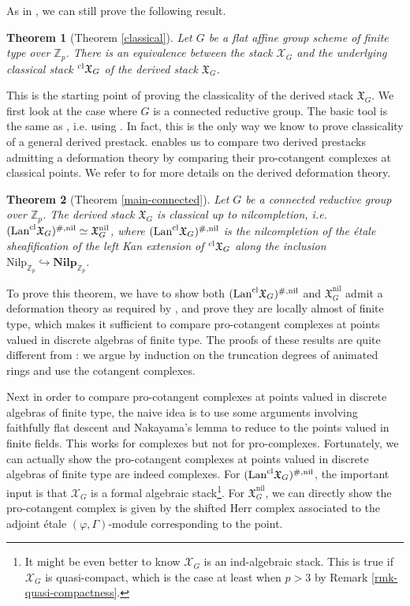 \documentclass[10pt]{article}
\newtheorem{thm}{Theorem}[section]
\numberwithin{equation}{section}
\newcommand{\frakX}{{\mathfrak X}}
\newcommand{\bZ}{{\mathbb Z}}
\newcommand{\calX}{{\mathcal X}}
\newcommand{\Lan}{{\mathrm{Lan}}}
\newcommand{\nil}{\mathrm{nil}}
\newcommand{\cl}{{\mathrm{\rm cl}}}             %
\newcommand{\Nilp}{\mathrm{Nilp}}
\begin{document}
As in \cite{Min23}, we can still prove the following result.
\begin{thm}[Theorem \ref{classical}]\label{step1}
    Let $G$ be a flat affine group scheme of finite type over $\bZ_p$. There is an equivalence between the stack $\calX_G$ and the underlying classical stack $^{\rm cl}\frakX_G$ of the derived stack $\frakX_G$.
\end{thm}

This is the starting point of proving  the classicality of the derived stack $\frakX_G$. We first look at the case where $G$ is a connected reductive group. The basic tool is the same as \cite{Min23}, i.e. using \cite[Chapter 1, Proposition 8.3.2]{GR17}. In fact, this is the only way we know to prove classicality of a general derived prestack. \cite[Chapter 1, Proposition 8.3.2]{GR17} enables us to compare two derived prestacks admitting a deformation theory by comparing their pro-cotangent complexes at classical points. We refer to \cite[Section 3]{Min23} for more details on the derived deformation theory.

\begin{thm}[Theorem \ref{main-connected}]\label{classicality}
    Let $G$ be a connected reductive group over $\bZ_p$. The derived stack $\frakX_G$ is classical up to nilcompletion, i.e. $(\Lan ^{\cl}\frakX_G)^{\#,\nil}\simeq \frakX_G^{\nil}$, where $(\Lan ^{\cl}\frakX_G)^{\#,\nil}$ is the nilcompletion of the \'etale sheafification of the left Kan extension of $^{\cl}\frakX_G$ along the inclusion $\Nilp_{\bZ_p}\hookrightarrow \textbf{Nilp}_{\bZ_p}$.
\end{thm}

To prove this theorem, we have to show both $(\Lan ^{\cl}\frakX_G)^{\#,\nil}$ and $\frakX_G^{\nil}$ admit a deformation theory as required by \cite[Chapter 1, Proposition 8.3.2]{GR17}, and prove they are locally almost of finite type, which makes it sufficient to compare pro-cotangent complexes at  points valued in discrete algebras of finite type. The proofs of these results are quite different from \cite{Min23}: we argue by induction on the truncation degrees of animated rings and use the cotangent complexes.

Next in order to compare pro-cotangent complexes at  points valued in discrete algebras of finite type, the naive idea is to use some arguments involving faithfully flat descent and Nakayama's lemma to reduce to the points valued in finite fields. This works for complexes but not for pro-complexes. Fortunately, we can actually show the pro-cotangent complexes at  points valued in discrete algebras of finite type are indeed complexes. For $(\Lan ^{\cl}\frakX_G)^{\#,\nil}$, the important input is that $\calX_G$ is a formal algebraic stack\footnote{It might be even better to know $\calX_G$ is an ind-algebraic stack. This is true if $\calX_G$ is quasi-compact, which is the case at least when $p>3$ by Remark \ref{rmk-quasi-compactness}. }. For $\frakX_G^{\nil}$, we can directly show the pro-cotangent complex is given by the shifted Herr complex associated to the adjoint \'etale $(\varphi,\Gamma)$-module corresponding to the point.
\end{document}
